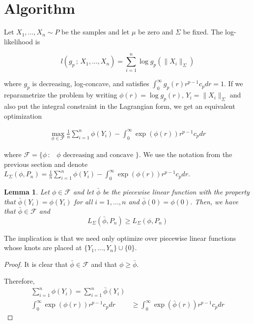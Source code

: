 \documentclass[12pt]{article}
\newtheorem{lemma}[theorem]{Lemma}
\begin{document}
\section{Algorithm}

Let $X_1, ..., X_n \sim P$ be the samples and let $\mu$ be zero and $\Sigma$ be fixed. The log-likelihood is

\[
l( g_p \,;\, X_1, ..., X_n) = \sum_{i=1}^n \log g_p( \| X_i \|_{\Sigma}) 
\]

where $g_p$ is decreasing, log-concave, and satisfies $\int_0^\infty g_p(r) r^{p-1} c_p dr = 1$. If we reparametrize the problem by writing $\phi(r) = \log g_p(r),\, Y_i = \| X_i \|_{\Sigma}$ and also put the integral constraint in the Lagrangian form, we get an equivalent optimization

\begin{align*}
\max_{\phi \in \mathcal{F}} \frac{1}{n} \sum_{i=1}^n \phi(Y_i) - \int_0^\infty \exp(\phi(r)) r^{p-1} c_p dr
\end{align*}

where $\mathcal{F} = \{ \phi \,:\, \text{ $\phi$ decreasing and concave } \}$. We use the notation from the previous section and denote $L_{\Sigma}(\phi, P_n) = \frac{1}{n} \sum_{i=1}^n \phi(Y_i) - \int_0^\infty \exp(\phi(r)) r^{p-1} c_p dr$.

\begin{lemma}

Let $\phi \in \mathcal{F}$ and let $\bar{\phi}$ be the piecewise linear function with the property that $\bar{\phi}(Y_i) = \phi(Y_i)$ for all $i=1,...,n$ and $\bar{\phi}(0) = \phi(0)$. Then, we have that $\bar{\phi} \in \mathcal{F}$ and
\[
L_{\Sigma}(\bar{\phi}, P_n) \geq L_{\Sigma}(\phi, P_n)
\]

\end{lemma}

The implication is that we need only optimize over piecewise linear functions whose knots are placed at $\{Y_1,..., Y_n\} \cup \{0\}$. 

\begin{proof}

It is clear that $\bar{\phi} \in \mathcal{F}$ and that $\phi \geq \bar{\phi}$. 

Therefore,
\begin{align*}
\sum_{i=1}^n \phi(Y_i) = \sum_{i=1}^n \bar{\phi}(Y_i) \\
\int_0^\infty \exp(\phi(r)) r^{p-1} c_p dr &\geq \int_0^\infty \exp(\bar{\phi}(r)) r^{p-1} c_p dr
\end{align*}

\end{proof} 
\end{document}
